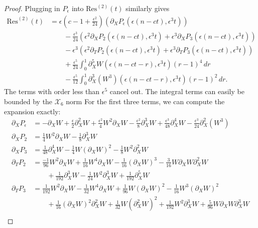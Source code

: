 \begin{proof}
	Plugging in \(P_\epsilon\) into \(\mathrm{Res}^{(2)}(t)\) similarly gives 
	\begin{equation}
	\begin{aligned}
		\mathrm{Res}^{(2)}(t) &= \epsilon\left(c-1 + \frac {\epsilon^2}{24} \right)\left( \partial_XP_\epsilon(\epsilon(n-ct),\epsilon^3 t) \right) \\
		&\qquad- \frac {\epsilon^3}{24} \left(\epsilon^2 \partial_X P_2(\epsilon(n-ct),\epsilon^3 t) + \epsilon^3 \partial_X P_3(\epsilon(n-ct),\epsilon^3 t) \right) \\
		&\qquad-\epsilon^3(\epsilon^2 \partial_TP_2(\epsilon(n-ct),\epsilon^3 t) + \epsilon^3 \partial_T P_3(\epsilon(n-ct),\epsilon^3 t)) \\
		&\qquad+ \frac{\epsilon^5}{24} \int_0^1 \partial_X^5 W(\epsilon(n-ct-r),\epsilon^3t)(r-1)^4 \, d r \\
		&\qquad- \frac {\epsilon^5}{12} \int_0^1 \partial^3_X(W^3)(\epsilon(n-ct-r), \epsilon^3 t)(r-1)^2 \, d r.
	\end{aligned}
	\end{equation}
	The terms with order less than \(\epsilon^5\) cancel out. The integral terms can easily be bounded by the \(\mathcal X_6\) norm For the first three terms, we can compute the expansion exactly:
	\begin{equation}
	\begin{aligned}
		\partial_X P_\epsilon &= - \partial_X^ {} W + \frac \epsilon 2 \partial_X^ 2 W + \frac{\epsilon^2} 4 W^2 \partial_X^ {} W - \frac{\epsilon^2} 8 \partial_X^ 3 W + \frac{\epsilon^3}{48} \partial_X^ 4 W - \frac{\epsilon^3}{24} \partial_X^ 2 (W^3) \\
		\partial_X^ {} P_2 &= \frac 1 4 W^2 \partial_X^ {} W - \frac 1 8 \partial_X^ 3 W \\
		\partial_X^ {} P_3 &= \frac 1 {48} \partial_X^ 4 W - \frac 1 4 W (\partial_X^ {} W)^2 - \frac 1 8 W^2 \partial_X^ 2 W \\
		\partial_T P_2 &= \frac{-1}{96} W^2 \partial_X^ {} W + \frac 1 {16} W^4 \partial_X^ {} W - \frac 1 {16} (\partial_X^ {} W)^3 - \frac 3 {16} W \partial_X^ {} W \partial_X^ 2 W \\
		&\qquad +\frac 1 {192} \partial_X^ 3 W - \frac 1 {24} W^2 \partial_X^ 3 W + \frac 1 {192} \partial_X^ 5 W \\
		\partial_T P_3 &= \frac 1 {192} W^2 \partial_X^ {} W - \frac 1 {32} W^4 \partial_X^ {} W + \frac 1 {96} W (\partial_X^ {} W)^2 - \frac 1 {16} W^3 (\partial_X^ {} W)^2 \\
		&\qquad+ \frac 1 {16} (\partial_X^ {} W)^2\partial_X^ 2 W + \frac 1 {32} W (\partial_X^ 2 W)^2 +\frac 1 {192} W^2 \partial_X^ 3 W + \frac 5 {96} W \partial_X^ {} W \partial_X^ 3 W \\

\end{aligned}
\end{equation}
\end{proof}
